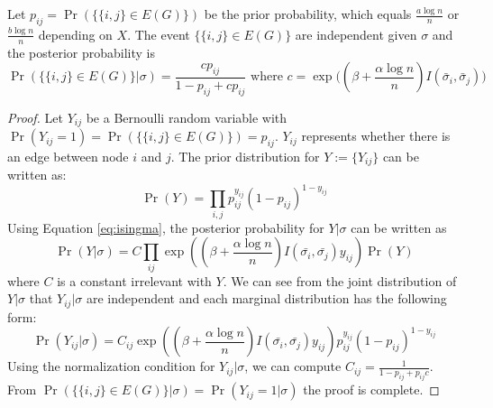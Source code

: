 \documentclass{article}
\begin{document}
\begin{lemma}\label{lem:post_independent}
	Let $p_{ij}=\Pr(\{\{i,j\} \in E(G) \})$ be the prior probability, which equals $\frac{a\log n}{n}$ or $\frac{b\log n}{n}$ depending on $X$.
	The event $\{\{i,j\} \in E(G) \}$ are independent given $\sigma$ and the posterior probability is
	\begin{equation}
	\Pr(\{\{i,j\} \in E(G) \} | \sigma) = \frac{c p_{ij} }{1-p_{ij} + cp_{ij}} \text{ where  } c= \exp\Big((\beta + \frac{\alpha \log n}{n} ) I(\bar{\sigma}_i, \bar{\sigma}_j) \Big)
	\end{equation}
\end{lemma}
\begin{proof}
	Let $Y_{ij}$ be a Bernoulli random variable with $\Pr(Y_{ij} = 1) = \Pr(\{\{i,j\} \in E(G)\}) = p_{ij}$. $Y_{ij}$ represents whether there is an edge between node $i$ and $j$.
	The prior distribution for $Y:=\{Y_{ij}\}$ can be written as:
	$$
	\Pr(Y) = \prod_{i,j} p_{ij}^{y_{ij}} (1-p_{ij})^{1-y_{ij}}
	$$ 
	Using Equation \eqref{eq:isingma}, the posterior probability for $Y| \sigma$ can be written as
	$$
	\Pr(Y|\sigma) = C\prod_{ij} \exp((\beta + \frac{\alpha \log n}{n})I(\bar{\sigma_i}, \bar{\sigma_j} )y_{ij}) \Pr(Y)
	$$
	where $C$ is a constant irrelevant with $Y$.
	We can see from the joint distribution of $Y|\sigma$ that $Y_{ij} | \sigma$ are independent and each marginal distribution has the following form:
	$$
	\Pr(Y_{ij} | \sigma) = C_{ij} \exp((\beta + \frac{\alpha \log n}{n})I(\bar{\sigma_i}, \bar{\sigma_j} )y_{ij}) p_{ij}^{y_{ij}} (1-p_{ij})^{1-y_{ij}}
	$$
	Using the normalization condition for $Y_{ij} | \sigma $, we can compute $C_{ij} = \frac{1}{1-p_{ij} + p_{ij}c}$. From $\Pr(\{\{i,j\} \in E(G) \} | \sigma) =\Pr(Y_{ij}=1|\sigma)$ the proof is complete.
\end{proof}
\end{document}
